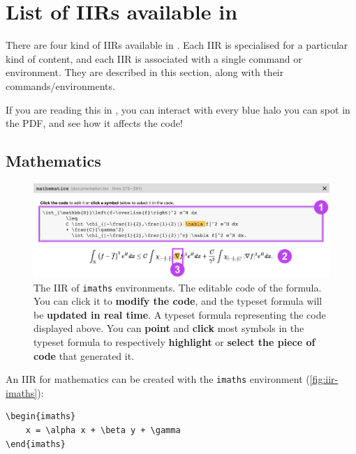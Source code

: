\section{List of IIRs available in \iLaTeX{}}
\label{sec:list-of-irrs}

There are four kind of IIRs available in \iLaTeX{}.
Each IIR is specialised for a particular kind of content, and each IIR is associated with a single command or environment.
They are described in this section, along with their commands/environments.

If you are reading this in \iLaTeX{}, you can interact with every blue halo you can spot in the PDF, and see how it affects the code!




\subsection{Mathematics}

\begin{figure}[hb!]
    \centering
    \includegraphics[width = \textwidth]{img/iir-imaths.png}
    \caption{The IIR of \texttt{imaths} environments.  The editable code of the formula. You can click it to \textbf{modify the code}, and the typeset formula will be \textbf{updated in real time}.  A typeset formula representing the code displayed above.  You can \textbf{point} and \textbf{click} most symbols in the typeset formula to respectively \textbf{highlight} or \textbf{select the piece of code} that generated it.}
    \label{fig:iir-imaths}
\end{figure}

An IIR for mathematics can be created with the \texttt{imaths} environment (\autoref{fig:iir-imaths}):

\begin{lstlisting}[style=custom-latex]
\begin{imaths}
    x = \alpha x + \beta y + \gamma
\end{imaths}
\end{lstlisting}


